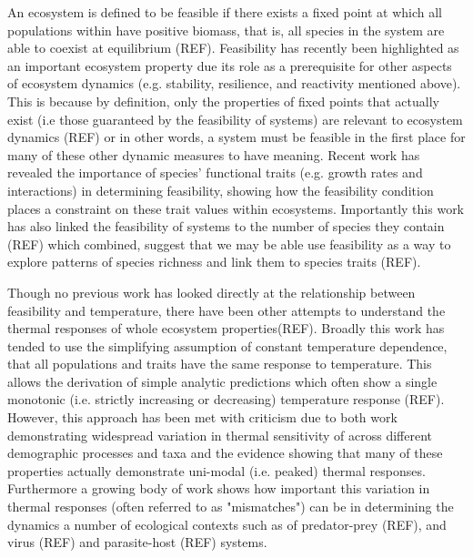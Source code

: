 \documentclass{article}
\begin{document}
An ecosystem is defined to be feasible if there exists a fixed point at which all populations within have positive biomass, that is, all species in the system are able to coexist at equilibrium (REF). Feasibility has recently been highlighted as an important ecosystem property due its role as a prerequisite for other aspects of ecosystem dynamics (e.g. stability, resilience, and reactivity mentioned above). This is because by definition, only the properties of fixed points that actually exist (i.e those guaranteed by the feasibility of systems) are relevant to ecosystem dynamics (REF) or in other words, a system must be feasible in the first place for many of these other dynamic measures to have meaning. Recent work has revealed the importance of species' functional traits (e.g. growth rates and interactions) in determining feasibility, showing how the feasibility condition places a constraint on these trait values within ecosystems. Importantly this work has also linked the feasibility of systems to the number of species they contain (REF) which combined, suggest that we may be able use feasibility as a way to explore patterns of species richness and link them to species traits (REF). 

Though no previous work has looked directly at the relationship between feasibility and temperature, there have been other attempts to understand the thermal responses of whole ecosystem properties(REF). Broadly this work has tended to use the simplifying assumption of constant temperature dependence, that all populations and traits have the same response to temperature. This allows the derivation of simple analytic predictions which often show a single monotonic (i.e. strictly increasing or decreasing) temperature response (REF). However, this approach has been met with criticism due to both work demonstrating widespread variation in thermal sensitivity of across different demographic processes and taxa and the evidence showing that many of these properties actually demonstrate uni-modal (i.e. peaked) thermal responses. Furthermore a growing body of work shows how important this variation in thermal responses (often referred to as "mismatches") can be in determining the dynamics a number of ecological contexts such as of predator-prey (REF), and virus (REF) and parasite-host (REF)  systems.  
\end{document}
